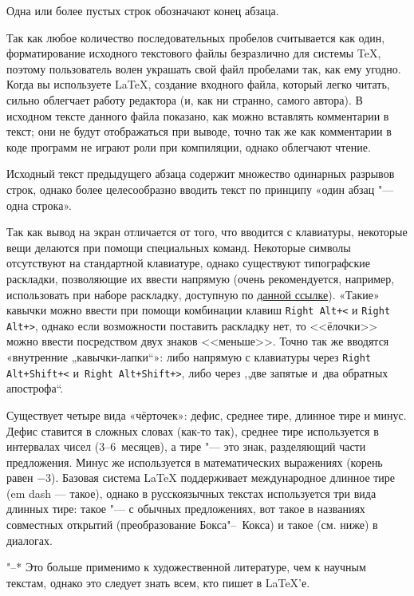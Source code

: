 \documentclass[final,pdftex]{epsilonj}
\numberwithin{equation}{section}
\begin{document}
Одна   или более пустых строк обозначают конец абзаца.

Так как любое количество последовательных пробелов считывается как
один, форматирование исходного текстового файлы безразлично для
системы 
      \TeX,         %
поэтому пользователь волен украшать свой файл пробелами так,
как ему угодно.
Когда вы используете
      \LaTeX,       %
создание входного файла, который легко читать, сильно облегчает
работу редактора (и, как ни странно, самого автора).
В исходном тексте данного файла показано, как можно вставлять комментарии в текст; они не будут отображаться при выводе, точно так же как комментарии в коде программ не играют роли при компиляции, однако облегчают чтение.

Исходный текст предыдущего абзаца содержит множество одинарных разрывов строк, однако более целесообразно вводить текст по принципу «один абзац "--- одна строка».

Так как вывод на экран отличается от того, что вводится с клавиатуры, некоторые вещи делаются при помощи специальных команд. Некоторые символы отсутствуют на стандартной клавиатуре, однако существуют типографские раскладки, позволяющие их ввести напрямую (очень рекомендуется, например, использовать при наборе раскладку, доступную по \href{http://ilyabirman.ru/projects/typography-layout/}{данной ссылке}). 
«Такие» кавычки можно ввести при помощи комбинации клавиш \texttt{Right Alt+<} и \texttt{Right Alt+>}, однако если возможности поставить раскладку нет, то <<ёлочки>> можно ввести посредством двух знаков <<меньше>>. Точно так же вводятся «внутренние „кавычки-лапки“»: либо напрямую с клавиатуры через \texttt{Right Alt+Shift+<} и~\texttt{Right Alt+Shift+>}, либо через ,,две запятые и~два обратных апострофа``.

Существует четыре вида «чёрточек»: дефис, среднее тире, длинное тире и минус. Дефис ставится в сложных словах (как-то так), среднее тире используется в интервалах чисел (3--6~месяцев), а тире "--- это знак, разделяющий части предложения. Минус же используется в математических выражениях (корень равен $-3$). Базовая система \LaTeX{} поддерживает международное длинное тире (em dash --- такое), однако в русскоязычных текстах используется три вида длинных тире: такое "--- с обычных предложениях, вот такое в названиях совместных открытий (преобразование Бокса"--~Кокса) и такое (см. ниже) в диалогах.

"--* Это больше применимо к художественной литературе, чем к научным текстам, однако это следует знать всем, кто пишет в \LaTeX'е.
\end{document}

